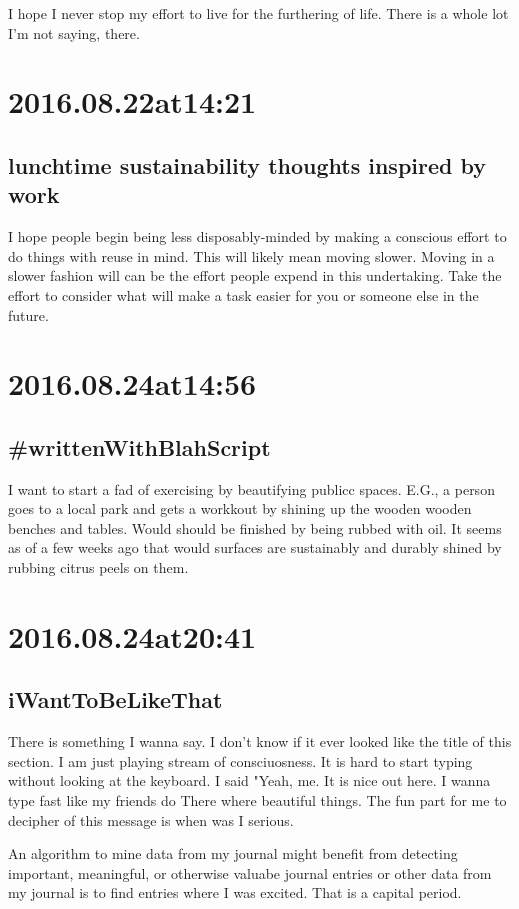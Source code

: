 I hope I never stop my effort to live for the furthering of life. There is a whole lot I'm not saying, there.

\section*{ 2016.08.22at14:21 }
\subsection*{lunchtime sustainability thoughts inspired by work}
I hope people begin being less disposably-minded by making a conscious effort to do things with reuse in mind.
This will likely mean moving slower.
Moving in a slower fashion will can be the effort people expend in this undertaking.
Take the effort to consider what will make a task easier for you or someone else in the future.

\section*{ 2016.08.24at14:56 }
\subsection*{\#writtenWithBlahScript }
I want to start a fad of exercising by beautifying publicc spaces. E.G., a person goes to a local park and gets a workkout by shining up the wooden wooden benches and tables. Would should be finished by being rubbed with oil. It seems as of a few weeks ago that  would surfaces are sustainably and durably shined by rubbing citrus peels on them.

\section*{ 2016.08.24at20:41 }
\subsection*{iWantToBeLikeThat}
There is something I wanna say. I don't know if it ever looked like the title of this section. I am just playing stream of consciuosness. It is hard to start typing without looking at the keyboard. I said "Yeah, me. It is nice out here. I wanna type fast like my friends do There where beautiful things. The fun part for me to decipher of this message is when was I serious.

An algorithm to mine data from my journal might benefit from detecting important, meaningful, or otherwise valuabe journal entries or other data from my journal is to find entries where I was excited. That is a capital period.

